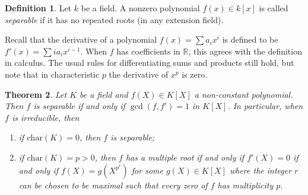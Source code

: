 \documentclass[12pt]{report}
\newtheorem{theorem}{Theorem}[section]
\theoremstyle{definition}
\newtheorem{definition}[theorem]{Definition}
\newcommand{\charr}{\text{char}}
\newcommand{\RR}{\mathbb{R}}
\begin{document}
\begin{definition}
	Let $k$ be a field. A nonzero polynomial $f(x) \in k[x]$ is called \emph{separable} if it has no repeated roots (in any extension field).
\end{definition}

Recall that the derivative of a polynomial $f(x)=\sum a_i x^i$ is defined to be $f'(x) = \sum ia_ix^{i-1}$. When $f$ has coefficients in $\RR$, this agrees with the definition in calculus. The usual rules for differentiating sums and products still hold, but note that in characteristic $p$ the derivative of $x^p$ is zero.

\begin{theorem}\label{sep}
	Let $K$ be a field and $f(X)\in K[X]$ a non-constant polynomial. Then $f$ is separable if and only if $\gcd(f,f')=1$ in $K[X]$. In particular, when $f$ is irreducible, then
	\begin{enumerate}
		\item  if $\charr(K)=0$, then $f$ is separable;
		\item  if $\charr(K)=p>0$, then $f$ has a multiple root if and only if $f'(X)=0$ if and only if $f(X)=g(X^{p^r})$ for some $g(X)\in K[X]$ where the integer $r$ can be chosen to be maximal such that every zero of $f$ has multiplicity $p$.
	\end{enumerate}
\end{theorem}
\end{document}
